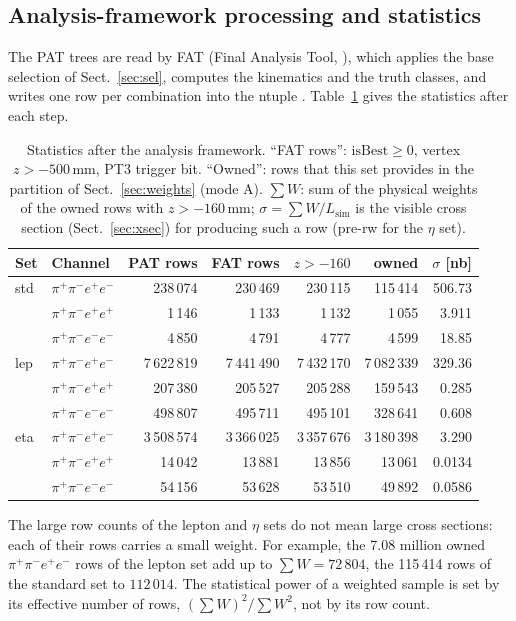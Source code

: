 \documentclass[11pt,a4paper]{article}
\newcommand{\ppee}{\ensuremath{\pi^{+}\pi^{-}e^{+}e^{-}}\xspace}
\newcommand{\Lsim}{\ensuremath{L_{\mathrm{sim}}}\xspace}
\newcommand{\code}[1]{\texttt{\detokenize{#1}}}
\begin{document}
\subsection{Analysis-framework processing and statistics}
The PAT trees are read by FAT (Final Analysis Tool, \code{main.cc}), which applies the
base selection of Sect.~\ref{sec:sel}, computes the kinematics and the truth classes, and
writes one row per combination into the ntuple \code{scan_nt}. Table~\ref{tab:fat} gives the
statistics after each step.

\begin{table}[H]
\centering
\caption{Statistics after the analysis framework. ``FAT rows'': $\mathrm{isBest}\ge0$,
vertex $z>-500$\,mm, PT3 trigger bit. ``Owned'': rows that this set provides in the
partition of Sect.~\ref{sec:weights} (mode A). $\sum W$: sum of the physical weights of the
owned rows with $z>-160$\,mm; $\sigma = \sum W/\Lsim$ is the visible cross section (Sect.~\ref{sec:xsec}) for producing such
a row (pre-rw for the $\eta$ set).}
\label{tab:fat}
\begin{tabular}{@{}l l r r r r r@{}}
\toprule
Set & Channel & PAT rows & FAT rows & $z>-160$ & owned & $\sigma$ [nb] \\
\midrule
std & \ppee        &   238\,074 &   230\,469 &   230\,115 &   115\,414 & 506.73 \\
    & $\pi^+\pi^-e^+e^+$ &  1\,146 &  1\,133 &  1\,132 &  1\,055 & 3.911 \\
    & $\pi^+\pi^-e^-e^-$ &  4\,850 &  4\,791 &  4\,777 &  4\,599 & 18.85 \\
\midrule
lep & \ppee        & 7\,622\,819 & 7\,441\,490 & 7\,432\,170 & 7\,082\,339 & 329.36 \\
    & $\pi^+\pi^-e^+e^+$ &   207\,380 &   205\,527 &   205\,288 &   159\,543 & 0.285 \\
    & $\pi^+\pi^-e^-e^-$ &   498\,807 &   495\,711 &   495\,101 &   328\,641 & 0.608 \\
\midrule
eta & \ppee        & 3\,508\,574 & 3\,366\,025 & 3\,357\,676 & 3\,180\,398 & 3.290 \\
    & $\pi^+\pi^-e^+e^+$ &    14\,042 &    13\,881 &    13\,856 &    13\,061 & 0.0134 \\
    & $\pi^+\pi^-e^-e^-$ &    54\,156 &    53\,628 &    53\,510 &    49\,892 & 0.0586 \\
\bottomrule
\end{tabular}
\end{table}

The large row counts of the lepton and $\eta$ sets do not mean large cross sections: each
of their rows carries a small weight. For example, the 7.08 million owned \ppee rows of the
lepton set add up to $\sum W = 72\,804$, the 115\,414 rows of the standard set to
$112\,014$. The statistical power of a weighted sample is set by its effective number of
rows, $(\sum W)^2/\sum W^2$, not by its row count.
\end{document}
